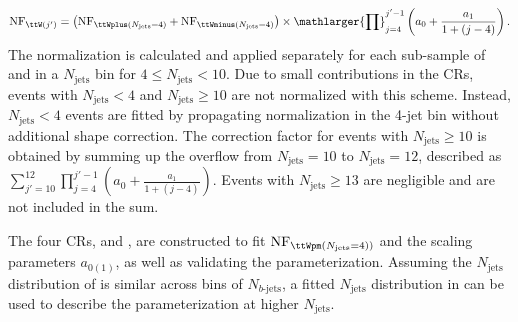 \documentclass[../thesis.tex]{subfiles}
\begin{document}
\begin{equation}
\label{eq:ttWdd}
\mathrm{NF}_{\ttW(j')} = \left(\mathrm{NF}_{\ttWplus(N_\mathrm{jets}=4)} + \mathrm{NF}_{\ttWminus(N_\mathrm{jets}=4)}\right) \times \mathlarger{\prod}_{j=4}^{j'-1} \left( a_0 + \frac{a_1}{1+(j-4)} \right).
\end{equation}
The normalization is calculated and applied separately for each sub-sample of \ttWplus and \ttWminus in a $N_\mathrm{jets}$ bin for $4\leq N_\mathrm{jets}<10$. Due to small contributions in the \acs{CR}s, events with $N_\mathrm{jets}<4$ and $N_\mathrm{jets}\geq 10$ are not normalized with this scheme. Instead, $N_\mathrm{jets}<4$ events are fitted by propagating normalization in the 4-jet bin without additional shape correction. The correction factor for \ttW events with $N_\mathrm{jets}\geq 10$ is obtained by summing up the overflow from $N_\mathrm{jets}=10$ to $N_\mathrm{jets}=12$, described as $\sum_{j'=10}^{12} \prod_{j=4}^{j'-1}\left(a_0+\frac{a_1}{1+(j-4)}\right)$. Events with $N_\mathrm{jets}\geq 13$ are negligible and are not included in the sum.

The four \acs{CR}s, \CRttWpm and \CRonebpm, are constructed to fit $\mathrm{NF}_{\ttWpm(N_\mathrm{jets}=4))}$ and the scaling parameters $a_{0(1)}$, as well as validating the parameterization. Assuming the $N_\mathrm{jets}$ distribution of \ttW is similar across bins of $N_{b\text{-jets}}$, a fitted $N_\mathrm{jets}$ distribution in \CRonebpm can be used to describe the \ttW parameterization at higher $N_\mathrm{jets}$.
\end{document}
